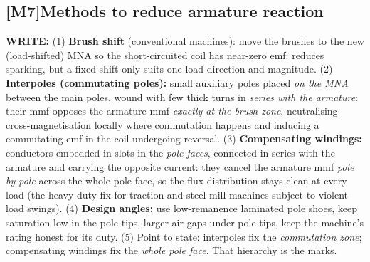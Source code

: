 \documentclass[11pt]{article}
\newcommand{\q}[2]{\subsection*{\color{copper}#1\quad\color{iron}#2}}
\newcommand{\w}[1]{\textbf{\color{copper}WRITE:} #1}
\begin{document}
\q{[M7]}{Methods to reduce armature reaction}
\w{(1) \textbf{Brush shift} (conventional machines): move the brushes to the new (load-shifted) MNA so the short-circuited coil has near-zero emf: reduces sparking, but a fixed shift only suits one load direction and magnitude. (2) \textbf{Interpoles (commutating poles):} small auxiliary poles placed \emph{on the MNA} between the main poles, wound with few thick turns in \emph{series with the armature}: their mmf opposes the armature mmf \emph{exactly at the brush zone}, neutralising cross-magnetisation locally where commutation happens and inducing a commutating emf in the coil undergoing reversal. (3) \textbf{Compensating windings:} conductors embedded in slots in the \emph{pole faces}, connected in series with the armature and carrying the opposite current: they cancel the armature mmf \emph{pole by pole} across the whole pole face, so the flux distribution stays clean at every load (the heavy-duty fix for traction and steel-mill machines subject to violent load swings). (4) \textbf{Design angles:} use low-remanence laminated pole shoes, keep saturation low in the pole tips, larger air gaps under pole tips, keep the machine's rating honest for its duty. (5) Point to state: interpoles fix the \emph{commutation zone}; compensating windings fix the \emph{whole pole face}. That hierarchy is the marks.}
\end{document}

